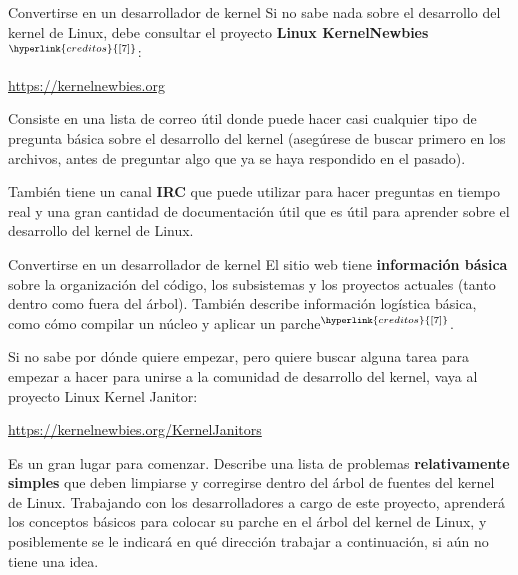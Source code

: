 \begin{frame}[c]{Convertirse en un desarrollador de kernel}
  Si no sabe nada sobre el desarrollo del kernel de Linux, debe consultar
  el proyecto \textbf{Linux KernelNewbies}$^{\hyperlink{creditos}{[7]}}$:

  \begin{block}{}
    \begin{center}
      \href{https://kernelnewbies.org}{https://kernelnewbies.org}
    \end{center}
  \end{block}

  \vspace{\baselineskip}
  Consiste en una lista de correo útil donde puede hacer casi cualquier
  tipo de pregunta básica sobre el desarrollo del kernel
  (asegúrese de buscar primero en los archivos, antes de preguntar algo que
  ya se haya respondido en el pasado).

  \vspace{\baselineskip}
  También tiene un canal \textbf{IRC} que puede
  utilizar para hacer preguntas en tiempo real y una gran cantidad de
  documentación útil que es útil para aprender sobre el desarrollo del
  kernel de Linux.

\end{frame}

\begin{frame}[c]{Convertirse en un desarrollador de kernel}
  El sitio web tiene \textbf{información básica} sobre la organización del
  código, los subsistemas y los proyectos actuales (tanto dentro como fuera del
  árbol). También describe información logística básica, como cómo compilar
  un núcleo y aplicar un parche$^{\hyperlink{creditos}{[7]}}$.

  \vspace{\baselineskip}
  Si no sabe por dónde quiere empezar, pero quiere buscar alguna tarea
  para empezar a hacer para unirse a la comunidad de desarrollo del kernel,
  vaya al proyecto Linux Kernel Janitor:

  \begin{exampleblock}{}
    \begin{center}
      \href{https://kernelnewbies.org/KernelJanitors}
        {https://kernelnewbies.org/KernelJanitors}
    \end{center}
  \end{exampleblock}

  Es un gran lugar para comenzar. Describe una lista de problemas
  \textbf{relativamente simples} que deben limpiarse y corregirse dentro
  del árbol de fuentes del kernel de Linux. Trabajando con los
  desarrolladores a cargo de este proyecto, aprenderá los conceptos
  básicos para colocar su parche en el árbol del kernel de Linux, y
  posiblemente se le indicará en qué dirección trabajar a continuación,
  si aún no tiene una idea.
\end{frame}

